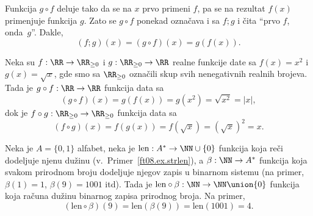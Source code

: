 \medskip

Funkcija $g \circ f$ deluje tako da se na $x$ prvo primeni $f$, pa se na rezultat $f(x)$ primenjuje funkcija $g$. Zato se
$g \circ f$ ponekad ozna\v cava i sa $f \mathbin; g$ i \v cita ``prvo $f$, onda~$g$''. Dakle,
$$
 (f \mathbin; g)(x) = (g \circ f)(x) = g(f(x)).
$$

\begin{EX}
  Neka su $f : \RR \to \RR_{\ge 0}$ i $g : \RR_{\ge 0} \to \RR$ realne funkcije date sa
  $f(x) = x^2$ i $g(x) = \sqrt x$, gde smo sa $\RR_{\ge 0}$ ozna\v cili skup svih nenegativnih realnih brojeva.
  Tada je $g \circ f : \RR \to \RR$ funkcija data sa
  $$
    (g \circ f)(x) = g(f(x)) = g(x^2) = \sqrt{x^2} = |x|,
  $$
  dok je $f \circ g : \RR_{\ge 0} \to \RR_{\ge 0}$ funkcija data sa
  $$
    (f \circ g)(x) = f(g(x)) = f(\sqrt x) = (\sqrt{x})^2 = x.
  $$
\end{EX}

\begin{EX}
  Neka je $A = \{0, 1\}$ alfabet, neka je $\mathrm{len} : A^* \to \NN \cup \{0\}$ funkcija koja re\v ci dodeljuje njenu
  du\v zinu (v.~Primer~\ref{ft08.ex.strlen}), a $\beta : \NN \to A^*$ funkcija koja svakom prirodnom broju dodeljuje
  njegov zapis u binarnom sistemu (na primer, $\beta(1) = 1$, $\beta(9) = 1001$ itd). Tada je
  $\mathrm{len} \circ \beta : \NN \to \NN \union \{0\}$ funkcija koja ra\v cuna du\v zinu binarnog zapisa prirodnog broja.
  Na primer,
  $$
    (\mathrm{len} \circ \beta)(9) = \mathrm{len}(\beta(9)) = \mathrm{len}(1001) = 4.
  $$
\end{EX}

